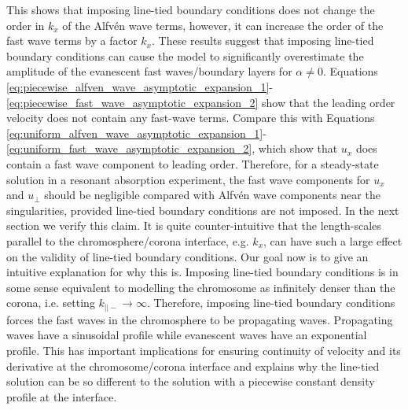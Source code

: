 This shows that imposing line-tied boundary conditions does not change the order in $k_x$ of the Alfv\'en wave terms, however, it can increase the order of the fast wave terms by a factor $k_x$. These results suggest that imposing line-tied boundary conditions can cause the model to significantly overestimate the amplitude of the evanescent fast waves/boundary layers for $\alpha\ne0$.
Equations \eqref{eq:piecewise_alfven_wave_asymptotic_expansion_1}-\eqref{eq:piecewise_fast_wave_asymptotic_expansion_2} show that the leading order velocity does not contain any fast-wave terms. Compare this with Equations \eqref{eq:uniform_alfven_wave_asymptotic_expansion_1}-\eqref{eq:uniform_fast_wave_asymptotic_expansion_2}, which show that $u_x$ does contain a fast wave component to leading order. Therefore, for a steady-state solution in a resonant absorption experiment, the fast wave components for $u_x$ and $u_\perp$ should be negligible compared with Alfv\'en wave components near the singularities, provided line-tied boundary conditions are not imposed. In the next section we verify this claim. It is quite counter-intuitive that the length-scales parallel to the chromosphere/corona interface, e.g. $k_x$, can have such a large effect on the validity of line-tied boundary conditions. Our goal now is to give an intuitive explanation for why this is. Imposing line-tied boundary conditions is in some sense equivalent to modelling the chromosome as infinitely denser than the corona, i.e. setting $k_{||-}\rightarrow \infty$. Therefore, imposing line-tied boundary conditions forces the fast waves in the chromosphere to be propagating waves. Propagating waves have a sinusoidal profile while evanescent waves have an exponential profile. This has important implications for ensuring continuity of velocity and its derivative at the chromosome/corona interface and explains why the line-tied solution can be so different to the solution with a piecewise constant density profile at the interface.



